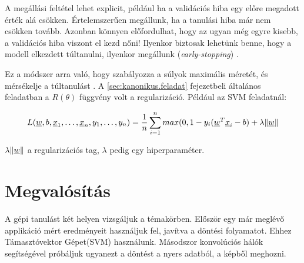 
A megállási feltétel lehet explicit, például ha a validációs hiba egy előre
megadott érték alá csökken. Értelemszerűen megállunk, ha a tanulási hiba már nem csökken tovább.
Azonban könnyen előfordulhat, hogy az ugyan még egyre kisebb, a validációs hiba
viszont el kezd nőni! Ilyenkor biztosak lehetünk benne, hogy a modell elkezdett
túltanulni, ilyenkor megállunk (\textit{early-stopping}) \cite{earlystopping}.




Ez a módszer arra való, hogy szabályozza a súlyok maximális méretét, és mérsékelje a túltanulást \cite{regularizacio}. A \ref{sec:kanonikus.feladat} fejezetbeli általános feladatban a $ R(\theta) $ függvény volt a regularizáció. Például az SVM feladatnál:


\[  L(\underline{w},b, \underline{x}_1, \dots, \underline{x}_n, y_1, \dots, y_n)  = \frac{1}{n} \sum\limits_{i=1}^{n} 
max(0, 1 - y_i(\underline{w}^T \underline{x}_i - b) + \lambda \lVert\underline{w}\rVert  \]

\noindent
$  \lambda \lVert\underline{w}\rVert $ a regularizációs tag, $ \lambda $ pedig egy hiperparaméter.





\newpage
\section{Megvalósítás}

A gépi tanulást két helyen vizsgáljuk a témakörben.
Először egy már meglévő applikáció mért eredményeit használjuk fel,
javítva a döntési folyamatot. Ehhez Támasztóvektor Gépet(SVM) használunk.
Másodszor konvolúciós hálók segítségével próbáljuk ugyanezt a döntést 
a nyers adatból, a képből meghozni. 

